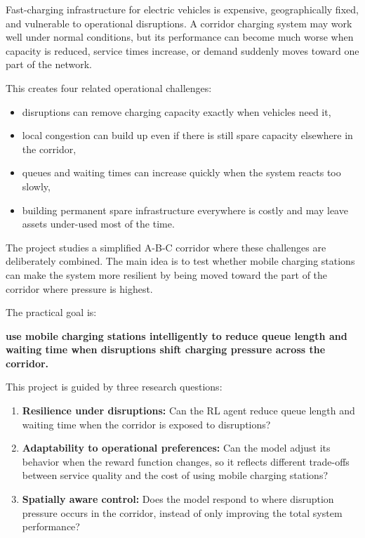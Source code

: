 \documentclass[11pt]{article}
\providecommand{\tightlist}{%
      \setlength{\itemsep}{0pt}\setlength{\parskip}{0pt}}
\begin{document}
Fast-charging infrastructure for electric vehicles is expensive,
geographically fixed, and vulnerable to operational disruptions. A
corridor charging system may work well under normal conditions, but its
performance can become much worse when capacity is reduced, service
times increase, or demand suddenly moves toward one part of the network.

This creates four related operational challenges:

\begin{itemize}
\tightlist
\item
  disruptions can remove charging capacity exactly when vehicles need
  it,
\item
  local congestion can build up even if there is still spare capacity
  elsewhere in the corridor,
\item
  queues and waiting times can increase quickly when the system reacts
  too slowly,
\item
  building permanent spare infrastructure everywhere is costly and may
  leave assets under-used most of the time.
\end{itemize}

The project studies a simplified A-B-C corridor where these challenges
are deliberately combined. The main idea is to test whether mobile
charging stations can make the system more resilient by being moved
toward the part of the corridor where pressure is highest.

The practical goal is:

\textbf{use mobile charging stations intelligently to reduce queue
length and waiting time when disruptions shift charging pressure across
the corridor.}

This project is guided by three research questions:

\begin{enumerate}
\def\labelenumi{\arabic{enumi}.}
\item
  \textbf{Resilience under disruptions:} Can the RL agent reduce queue
  length and waiting time when the corridor is exposed to disruptions?
\item
  \textbf{Adaptability to operational preferences:} Can the model adjust
  its behavior when the reward function changes, so it reflects
  different trade-offs between service quality and the cost of using
  mobile charging stations?
\item
  \textbf{Spatially aware control:} Does the model respond to where
  disruption pressure occurs in the corridor, instead of only improving
  the total system performance?
\end{enumerate}
\end{document}
